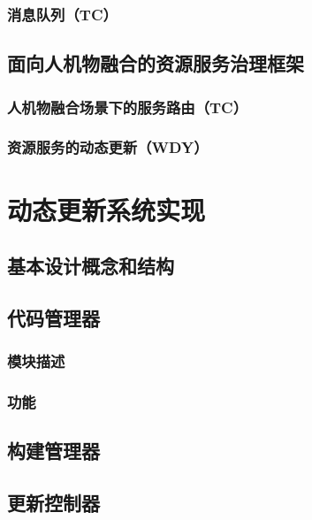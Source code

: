 \documentclass[12pt,a4paper]{article}
\theoremstyle{definition}
\begin{document}
\subsubsection{消息队列（TC）}

\subsection{面向人机物融合的资源服务治理框架}
\subsubsection{人机物融合场景下的服务路由（TC）}
\subsubsection{资源服务的动态更新（WDY）}
\section{动态更新系统实现}\label{}

\subsection{基本设计概念和结构}

\subsection{代码管理器}
\subsubsection{模块描述}
\subsubsection{功能}

\subsection{构建管理器}

\subsection{更新控制器}

\end{document}
